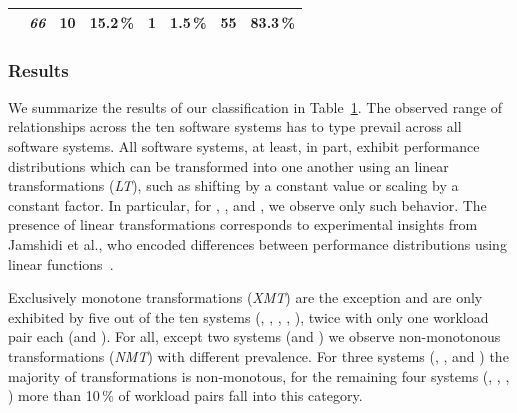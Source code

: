 {\begin{table}
\begin{tabular}{p{1.1cm}rrrrrrr}
	\zdrei & \textit{66} &
	\cellcolor{lt-color!15!white}10 & \cellcolor{lt-color!15!white}15.2\,\% & 
	\cellcolor{xmt-color!2!white}1 & \cellcolor{xmt-color!2!white}1.5\,\% & 
	\cellcolor{nmt-color!83!white}55 & \cellcolor{nmt-color!83!white}83.3\,\%\\
	
	\bottomrule
	\end{tabular}
	\label{tab:categorization_counts}
\end{table}

\subsubsection{Results}

We summarize the results of our classification in Table~\ref{tab:categorization_counts}. The observed range of relationships across the ten software systems has to type prevail across all software systems. 
All software systems, at least, in part, exhibit performance distributions which can be transformed into one another using an linear transformations (\textit{\colorbox{lt-color}{LT}}), such as shifting by a constant value or scaling by a constant factor. In particular, for \jumper, \jadx, and \xzwo, we observe only such behavior. The presence of linear transformations corresponds to experimental insights from Jamshidi et al., who encoded differences between performance distributions using linear functions~\cite{jamishidi_transfer_2017}.

Exclusively monotone transformations (\textit{\colorbox{xmt-color}{XMT}}) are the exception and are only exhibited by five out of the ten systems (\kanzi, \batik, \xz, \lrzip, \zdrei), twice with only one workload pair each (\xz and \zdrei).  
For all, except two systems (\jumper and \xzwo) we observe non-monotonous transformations (\textit{\colorbox{nmt-color}{NMT}}) with different prevalence.  For three systems (\dconvert, \htwo, and \zdrei) the majority of transformations is non-monotous, for the remaining four systems (\kanzi, \batik, \xz, \lrzip) more than 10\,\% of workload pairs fall into this category.

\vspace{1mm}

}
